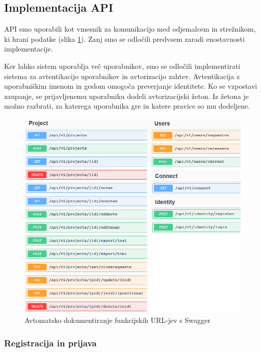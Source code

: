 \documentclass[a4paper, 12pt]{book}
\begin{document}
\subsection{Implementacija API}

API smo uporabili kot vmesnik za komunikacijo med odjemalcem in strežnikom, ki hrani podatke (slika \ref{api_routes}).
Zanj smo se odločili predvsem zaradi enostavnosti implementacije.

Ker lahko sistem uporablja več uporabnikov, smo se odločili implementirati sistema za avtentikacijo uporabnikov in avtorizacijo zahtev.
Avtentikacija z uporabniškim imenom in geslom omogoča preverjanje identitete.
Ko se vzpostavi zaupanje, se prijavljenemu uporabniku dodeli avtorizacijski žeton.
Iz žetona je možno razbrati, za katerega uporabnika gre in katere pravice so mu dodeljene.


\begin{figure}[H]
\begin{center}
\includegraphics[width=13.5cm]{api_routes_small}
\end{center}
\caption{Avtomatsko dokumentiranje funkcijskih URL-jev s Swagger}
\label{api_routes}
\end{figure}

\subsubsection{Registracija in prijava}
\end{document}
